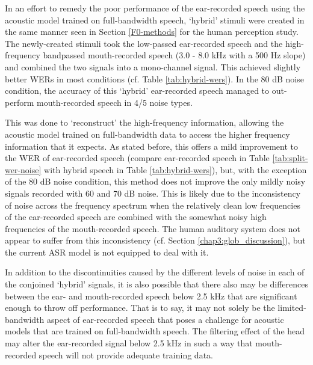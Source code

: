 
In an effort to remedy the poor performance of the ear-recorded speech using the acoustic model trained on full-bandwidth speech, `hybrid' stimuli were created in the same manner seen in Section \ref{F0-methods} for the human perception study.  The newly-created stimuli took the low-passed ear-recorded speech and the high-frequency bandpassed mouth-recorded speech (3.0 - 8.0 kHz with a 500 Hz slope) and combined the two signals into a mono-channel signal.  This achieved slightly better WERs in most conditions (cf. Table \ref{tab:hybrid-wers}).  In the 80 dB noise condition, the accuracy of this `hybrid' ear-recorded speech managed to out-perform mouth-recorded speech in 4/5 noise types.  

This was done to `reconstruct' the high-frequency information, allowing the acoustic model trained on full-bandwidth data to access the higher frequency information that it expects.  As stated before, this offers a mild improvement to the WER of ear-recorded speech (compare ear-recorded speech in Table \ref{tab:split-wer-noise} with hybrid speech in Table \ref{tab:hybrid-wers}), but, with the exception of the 80 dB noise condition, this method does not improve the only mildly noisy signals recorded with 60 and 70 dB noise.  This is likely due to the inconsistency of noise across the frequency spectrum when the relatively clean low frequencies of the ear-recorded speech are combined with the somewhat noisy high frequencies of the mouth-recorded speech.  The human auditory system does not appear to suffer from this inconsistency (cf. Section \ref{chap3:glob_discussion}), but the current ASR model is not equipped to deal with it.

In addition to the discontinuities caused by the different levels of noise in each of the conjoined `hybrid' signals, it is also possible that there also may be differences between the ear- and mouth-recorded speech below 2.5 kHz that are significant enough to throw off performance.  That is to say, it may not solely be the limited-bandwidth aspect of ear-recorded speech that poses a challenge for acoustic models that are trained on full-bandwidth speech.  The filtering effect of the head may alter the ear-recorded signal below 2.5 kHz in such a way that mouth-recorded speech will not provide adequate training data.



